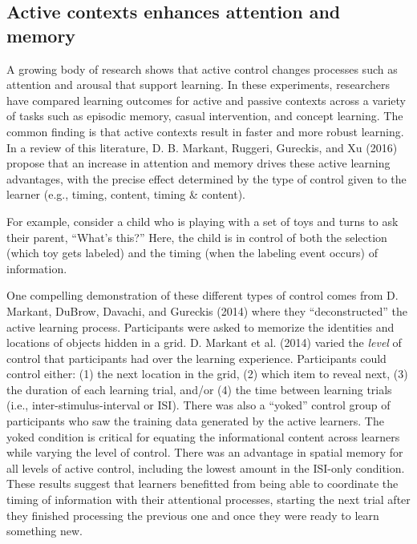 \documentclass[english,floatsintext,man]{apa6}
\theoremstyle{definition}
\theoremstyle{definition}
\theoremstyle{definition}
\theoremstyle{remark}
\begin{document}
\subsection{Active contexts enhances attention and
memory}\label{active-contexts-enhances-attention-and-memory}

A growing body of research shows that active control changes processes
such as attention and arousal that support learning. In these
experiments, researchers have compared learning outcomes for active and
passive contexts across a variety of tasks such as episodic memory,
casual intervention, and concept learning. The common finding is that
active contexts result in faster and more robust learning. In a review
of this literature, D. B. Markant, Ruggeri, Gureckis, and Xu (2016)
propose that an increase in attention and memory drives these active
learning advantages, with the precise effect determined by the type of
control given to the learner (e.g., timing, content, timing \& content).

For example, consider a child who is playing with a set of toys and
turns to ask their parent, \enquote{What's this?} Here, the child is in
control of both the selection (which toy gets labeled) and the timing
(when the labeling event occurs) of information.

One compelling demonstration of these different types of control comes
from D. Markant, DuBrow, Davachi, and Gureckis (2014) where they
\enquote{deconstructed} the active learning process. Participants were
asked to memorize the identities and locations of objects hidden in a
grid. D. Markant et al. (2014) varied the \emph{level} of control that
participants had over the learning experience. Participants could
control either: (1) the next location in the grid, (2) which item to
reveal next, (3) the duration of each learning trial, and/or (4) the
time between learning trials (i.e., inter-stimulus-interval or ISI).
There was also a \enquote{yoked} control group of participants who saw
the training data generated by the active learners. The yoked condition
is critical for equating the informational content across learners while
varying the level of control. There was an advantage in spatial memory
for all levels of active control, including the lowest amount in the
ISI-only condition. These results suggest that learners benefitted from
being able to coordinate the timing of information with their
attentional processes, starting the next trial after they finished
processing the previous one and once they were ready to learn something
new.
\end{document}
